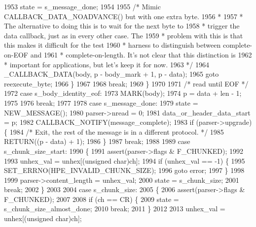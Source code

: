 \begin{DoxyCode}
1953           state = s_message_done;
1954 
1955           \textcolor{comment}{/* Mimic CALLBACK\_DATA\_NOADVANCE() but with one extra byte.}
1956 \textcolor{comment}{           *}
1957 \textcolor{comment}{           * The alternative to doing this is to wait for the next byte to}
1958 \textcolor{comment}{           * trigger the data callback, just as in every other case. The}
1959 \textcolor{comment}{           * problem with this is that this makes it difficult for the test}
1960 \textcolor{comment}{           * harness to distinguish between complete-on-EOF and}
1961 \textcolor{comment}{           * complete-on-length. It's not clear that this distinction is}
1962 \textcolor{comment}{           * important for applications, but let's keep it for now.}
1963 \textcolor{comment}{           */}
1964           _CALLBACK_DATA(body, p - body\_mark + 1, p - data);
1965           \textcolor{keywordflow}{goto} reexecute\_byte;
1966         \}
1967 
1968         \textcolor{keywordflow}{break};
1969       \}
1970 
1971       \textcolor{comment}{/* read until EOF */}
1972       \textcolor{keywordflow}{case} s_body_identity_eof:
1973         MARK(body);
1974         p = data + len - 1;
1975 
1976         \textcolor{keywordflow}{break};
1977 
1978       \textcolor{keywordflow}{case} s_message_done:
1979         state = NEW_MESSAGE();
1980         parser->nread = 0;
1981         data\_or\_header\_data\_start = p;
1982         CALLBACK_NOTIFY(message\_complete);
1983         \textcolor{keywordflow}{if} (parser->upgrade) \{
1984           \textcolor{comment}{/* Exit, the rest of the message is in a different protocol. */}
1985           RETURN((p - data) + 1);
1986         \}
1987         \textcolor{keywordflow}{break};
1988 
1989       \textcolor{keywordflow}{case} s_chunk_size_start:
1990       \{
1991         assert(parser->flags & F_CHUNKED);
1992 
1993         unhex\_val = unhex[(\textcolor{keywordtype}{unsigned} char)ch];
1994         \textcolor{keywordflow}{if} (unhex\_val == -1) \{
1995           SET_ERRNO(HPE_INVALID_CHUNK_SIZE);
1996           \textcolor{keywordflow}{goto} error;
1997         \}
1998 
1999         parser->content_length = unhex\_val;
2000         state = s_chunk_size;
2001         \textcolor{keywordflow}{break};
2002       \}
2003 
2004       \textcolor{keywordflow}{case} s_chunk_size:
2005       \{
2006         assert(parser->flags & F_CHUNKED);
2007 
2008         \textcolor{keywordflow}{if} (ch == CR) \{
2009           state = s_chunk_size_almost_done;
2010           \textcolor{keywordflow}{break};
2011         \}
2012 
2013         unhex\_val = unhex[(\textcolor{keywordtype}{unsigned} char)ch];

\end{DoxyCode}
